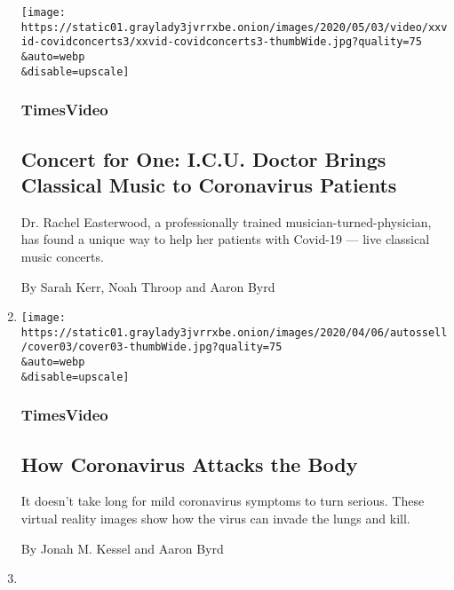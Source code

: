 \begin{enumerate}
  \texttt{[image: https://static01.graylady3jvrrxbe.onion/images/2020/05/03/video/xxvid-covidconcerts3/xxvid-covidconcerts3-thumbWide.jpg?quality=75\\\&auto=webp\\\&disable=upscale]}

  \hypertarget{timesvideo-1}{%
  \subsubsection{TimesVideo}\label{timesvideo-1}}

  \hypertarget{concert-for-one-icu-doctor-brings-classical-music-to-coronavirus-patients}{%
  \subsection{Concert for One: I.C.U. Doctor Brings Classical Music to
  Coronavirus
  Patients}\label{concert-for-one-icu-doctor-brings-classical-music-to-coronavirus-patients}}

  Dr. Rachel Easterwood, a professionally trained
  musician-turned-physician, has found a unique way to help her patients
  with Covid-19 --- live classical music concerts.

  By Sarah Kerr, Noah Throop and Aaron Byrd
\item
  \href{/video/health/100000007056651/covid-ards-acute-respiratory-distress-syndrome.html}{}

  \texttt{[image: https://static01.graylady3jvrrxbe.onion/images/2020/04/06/autossell/cover03/cover03-thumbWide.jpg?quality=75\\\&auto=webp\\\&disable=upscale]}

  \hypertarget{timesvideo-2}{%
  \subsubsection{TimesVideo}\label{timesvideo-2}}

  \hypertarget{how-coronavirus-attacks-the-body}{%
  \subsection{How Coronavirus Attacks the
  Body}\label{how-coronavirus-attacks-the-body}}

  It doesn't take long for mild coronavirus symptoms to turn serious.
  These virtual reality images show how the virus can invade the lungs
  and kill.

  By Jonah M. Kessel and Aaron Byrd
\item
  \href{/video/us/politics/100000006788245/impeachment-process-history.html}{}


\end{enumerate}
